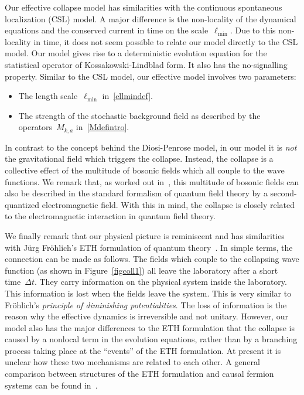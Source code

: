 \documentclass[reqno,11pt]{amsart}
\numberwithin{equation}{section}
\newcommand{\1}{\mathds{1}}
\newcommand{\itemD}{\item[{\raisebox{0.125em}{\tiny $\blacktriangleright$}}]}
\newcommand{\bitem}{\begin{itemize}[leftmargin=2.5em]}
\newcommand{\eitem}{\end{itemize}}
\begin{document}
Our effective collapse model has similarities with the continuous spontaneous localization (CSL) model.
A major difference is the non-locality of the dynamical equations and the conserved current
in time on the scale~$\ell_{\min}$. Due to this non-locality in time, it does not seem possible to
relate our model directly to the CSL model. Our model gives rise to a deterministic evolution equation
for the statistical operator of Kossakowski-Lindblad form. It also has the no-signalling property.
Similar to the CSL model, our effective model involves two parameters:
\bitem
\itemD The length scale~$\ell_{\min}$ in~\eqref{ellmindef}.
\itemD The strength of the stochastic background field as described by the
operators~$M_{k,a}$ in~\eqref{Mdefintro}.
\eitem
In contrast to the concept behind the Diosi-Penrose model,
in our model it is {\em{not}} the gravitational field which triggers the collapse.
Instead, the collapse is a collective effect of the multitude of bosonic fields which all
couple to the wave functions. We remark that, as worked out in~\cite{fockdynamics}, this multitude of
bosonic fields can also be described in the standard formalism of quantum field theory by a second-quantized electromagnetic field. With this in mind, the collapse is closely related to the
electromagnetic interaction in quantum field theory.

We finally remark that our physical picture is reminiscent and has similarities with J\"urg Fr\"ohlich's
ETH formulation of quantum theory~\cite{froehlich2019review, frohlich2015math, F, froehlich-pizzo2,
froehlich-gang-pizzo}. In simple terms, the connection can be made as follows.
The fields which couple to the collapsing wave function (as shown in Figure~\ref{figcoll1})
all leave the laboratory after a short time~$\Delta t$. They carry information on the physical system
inside the laboratory. This information is lost when the fields leave the system.
This is very similar to Fr\"ohlich's {\em{principle of diminishing potentialities}}.
The loss of information is the reason why the effective dynamics is irreversible and not unitary.
However, our model also has the major differences to the ETH formulation that the collapse is
caused by a nonlocal term in the evolution equations, rather than by a branching process taking place
at the ``events'' of the ETH formulation. At present it is unclear how these two mechanisms are related
to each other. A general comparison between
structures of the ETH formulation and causal fermion systems can be found in~\cite{eth-cfs}.
\end{document}
